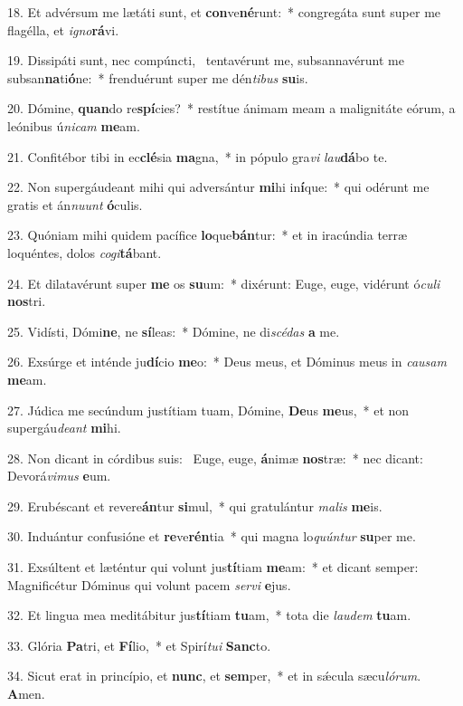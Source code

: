 18. Et advérsum me lætáti sunt, et \textbf{con}ve\textbf{né}runt:~*  congregáta sunt super me flagélla, et \textit{i}\textit{gno}\textbf{rá}vi.\

19. Dissipáti sunt, nec compúncti, \dag\  tentavérunt me, subsannavérunt me subsan\textbf{na}ti\textbf{ó}ne:~*  frenduérunt super me dén\textit{ti}\textit{bus} \textbf{su}is.\

20. Dómine, \textbf{quan}do re\textbf{spí}cies?~*  restítue ánimam meam a malignitáte eórum, a leónibus ú\textit{ni}\textit{cam} \textbf{me}am.\

21. Confitébor tibi in ec\textbf{clé}sia \textbf{ma}gna,~*  in pópulo gra\textit{vi} \textit{lau}\textbf{dá}bo te.\

22. Non supergáudeant mihi qui adversántur \textbf{mi}hi in\textbf{í}que:~*  qui odérunt me gratis et án\textit{nu}\textit{unt} \textbf{ó}culis.\

23. Quóniam mihi quidem pacífice \textbf{lo}que\textbf{bán}tur:~*  et in iracúndia terræ loquéntes, dolos \textit{co}\textit{gi}\textbf{tá}bant.\

24. Et dilatavérunt super \textbf{me} os \textbf{su}um:~*  dixérunt: Euge, euge, vidérunt ó\textit{cu}\textit{li} \textbf{nos}tri.\

25. Vidísti, Dómi\textbf{ne}, ne \textbf{sí}leas:~*  Dómine, ne di\textit{scé}\textit{das} \textbf{a} me.\

26. Exsúrge et inténde ju\textbf{dí}cio \textbf{me}o:~*  Deus meus, et Dóminus meus in \textit{cau}\textit{sam} \textbf{me}am.\

27. Júdica me secúndum justítiam tuam, Dómine, \textbf{De}us \textbf{me}us,~*  et non supergáu\textit{de}\textit{ant} \textbf{mi}hi.\

28. Non dicant in córdibus suis: \dag\  Euge, euge, \textbf{á}nimæ \textbf{nos}træ:~*  nec dicant: Devorá\textit{vi}\textit{mus} \textbf{e}um.\

29. Erubéscant et revere\textbf{án}tur \textbf{si}mul,~*  qui gratulántur \textit{ma}\textit{lis} \textbf{me}is.\

30. Induántur confusióne et \textbf{re}ve\textbf{rén}tia~*  qui magna lo\textit{quún}\textit{tur} \textbf{su}per me.\

31. Exsúltent et læténtur qui volunt jus\textbf{tí}tiam \textbf{me}am:~*  et dicant semper: Magnificétur Dóminus qui volunt pacem \textit{ser}\textit{vi} \textbf{e}jus.\

32. Et lingua mea meditábitur jus\textbf{tí}tiam \textbf{tu}am,~*  tota die \textit{lau}\textit{dem} \textbf{tu}am.\

33. Glória \textbf{Pa}tri, et \textbf{Fí}lio,~*  et Spirí\textit{tu}\textit{i} \textbf{Sanc}to.\

34. Sicut erat in princípio, et \textbf{nunc}, et \textbf{sem}per,~*  et in sǽcula sæcu\textit{ló}\textit{rum}. \textbf{A}men.\

